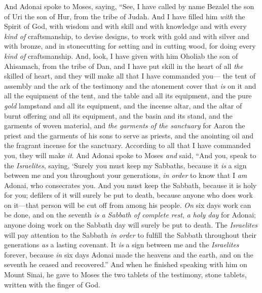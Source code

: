 \begin{biblechapter} %
 And Adonai spoke to Moses, saying,
\verse “See, I have called by name Bezalel the son of Uri the son of Hur, from the tribe of Judah.
\verse And I have filled him \textit{with} the Spirit of God, with wisdom and with skill and with knowledge and with every \textit{kind of} craftsmanship,
\verse to devise designs, to work with gold and with silver and with bronze,
\verse and in stonecutting for setting and in cutting wood, for doing every \textit{kind of} craftsmanship.
\verse And, look, I have given with him Oholiab the son of Ahisamach, from the tribe of Dan, and I have put skill in the heart of all \textit{the} skilled of heart, and they will make all that I have commanded you—
\verse the tent of assembly and the ark of the testimony and the atonement cover that \textit{is} on it and all the equipment of the tent,
\verse and the table and all its equipment, and the pure \textit{gold} lampstand and all its equipment, and the incense altar,
\verse and the altar of burnt offering and all its equipment, and the basin and its stand,
\verse and the garments of woven material, and \textit{the garments of the sanctuary} for Aaron the priest and the garments of his sons to serve as priests,
\verse and the anointing oil and the fragrant incense for the sanctuary. According to all that I have commanded you, they will make \textit{it}.
 And Adonai spoke to Moses \textit{and} said,
\verse “And you, speak to the \textit{Israelites}, saying, ‘Surely you must keep my Sabbaths, because it \textit{is} a sign between me and you throughout your generations, \textit{in order} to know that I \textit{am} Adonai, who consecrates you.
\verse And you must keep the Sabbath, because it is holy for you; defilers of it will surely be put to death, because anyone who does work on it—that person will be cut off from among his people.
\verse \textit{On} six days work can be done, and on the seventh \textit{is a Sabbath of complete rest}, \textit{a holy day} for Adonai; anyone doing work on the Sabbath day will surely be put to death.
\verse The \textit{Israelites} will pay attention to the Sabbath \textit{in order} to fulfill the Sabbath throughout their generations \textit{as} a lasting covenant.
\verse It \textit{is} a sign between me and the \textit{Israelites} forever, because \textit{in} six days Adonai made the heavens and the earth, and on the seventh he ceased and recovered.”
\verse And when he finished speaking with him on Mount Sinai, he gave to Moses the two tablets of the testimony, stone tablets, written with the finger of God.
\end{biblechapter}

